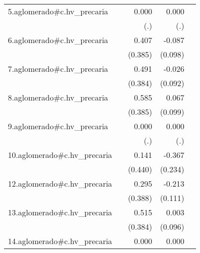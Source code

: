 {\begin{longtable}{l*{4}{D{.}{.}{-1}}}
\addlinespace
5.aglomerado#c.hv\_precaria&                     &       0.000         &       0.000         &                     \\
            &                     &         (.)         &         (.)         &                     \\
\addlinespace
6.aglomerado#c.hv\_precaria&                     &       0.407         &      -0.087         &                     \\
            &                     &     (0.385)         &     (0.098)         &                     \\
\addlinespace
7.aglomerado#c.hv\_precaria&                     &       0.491         &      -0.026         &                     \\
            &                     &     (0.384)         &     (0.092)         &                     \\
\addlinespace
8.aglomerado#c.hv\_precaria&                     &       0.585         &       0.067         &                     \\
            &                     &     (0.385)         &     (0.099)         &                     \\
\addlinespace
9.aglomerado#c.hv\_precaria&                     &       0.000         &       0.000         &                     \\
            &                     &         (.)         &         (.)         &                     \\
\addlinespace
10.aglomerado#c.hv\_precaria&                     &       0.141         &      -0.367         &                     \\
            &                     &     (0.440)         &     (0.234)         &                     \\
\addlinespace
12.aglomerado#c.hv\_precaria&                     &       0.295         &      -0.213         &                     \\
            &                     &     (0.388)         &     (0.111)         &                     \\
\addlinespace
13.aglomerado#c.hv\_precaria&                     &       0.515         &       0.003         &                     \\
            &                     &     (0.384)         &     (0.096)         &                     \\
\addlinespace
14.aglomerado#c.hv\_precaria&                     &       0.000         &       0.000         &                     \\

\end{longtable}}
